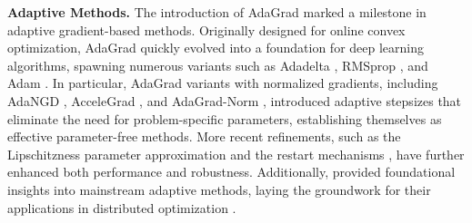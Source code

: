 \documentclass{article}
\theoremstyle{plain}
\theoremstyle{definition}
\theoremstyle{remark}
\begin{document}
\textbf{Adaptive Methods.}
The introduction of AdaGrad \citep{mcmahan2010adaptive,duchi2011adaptive} marked a milestone in adaptive gradient-based methods. Originally designed for online convex optimization, AdaGrad quickly evolved into a foundation for deep learning algorithms, spawning numerous variants such as Adadelta \citep{zeiler2012adadelta}, RMSprop \citep{tieleman2017divide}, and Adam \citep{luo2019adaptive,xie2024adan}. In particular, AdaGrad variants with normalized gradients, including AdaNGD \citep{levy2017online}, AcceleGrad \citep{levy2018online}, and AdaGrad-Norm \citep{xie2020linear}, introduced adaptive stepsizes that eliminate the need for problem-specific parameters, establishing themselves as effective parameter-free methods.
More recent refinements, such as the Lipschitzness parameter approximation \citep{malitsky2019adaptive} and the restart mechanisms \citep{marumo2024parameter}, have further enhanced both performance and robustness. Additionally, \citet{yang2023two} provided foundational insights into mainstream adaptive methods, laying the groundwork for their applications in distributed optimization \citep{li2024problem,yan2025problem}.
\end{document}
